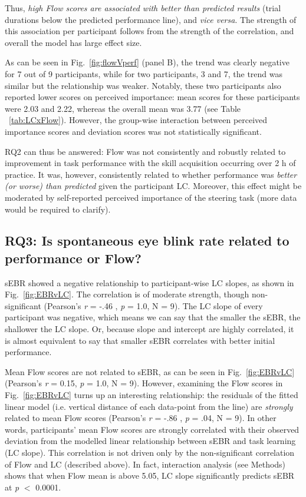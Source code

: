 \documentclass[fleqn,10pt]{wlscirep}
\begin{document}
Thus, {\it high Flow scores are associated with better than predicted results} (trial durations below the predicted performance line), and {\it vice versa}. The strength of this association per participant follows from the strength of the correlation, and overall the model has large effect size.

As can be seen in Fig.~\ref{fig:flowVperf} (panel B), the trend was clearly negative for 7 out of 9 participants, while for two participants, 3 and 7, the trend was similar but the relationship was weaker. Notably, these two participants also reported lower scores on perceived importance: mean scores for these participants were 2.03 and 2.22, whereas the overall mean was 3.77 (see Table ~\ref{tab:LCxFlow}). However, the group-wise interaction between perceived importance scores and deviation scores was not statistically significant.

RQ2 can thus be answered: Flow was not consistently and robustly related to improvement in task performance with the skill acquisition occurring over 2 h of practice. It was, however, consistently related to whether performance was {\it better (or worse) than predicted} given the participant LC. Moreover, this effect might be moderated by self-reported perceived importance of the steering task (more data would be required to clarify).

\subsection*{RQ3: Is spontaneous eye blink rate related to performance or Flow?}

sEBR showed a negative relationship to participant-wise LC slopes, as shown in Fig.~\ref{fig:EBRvLC}. The correlation is of moderate strength, though non-significant (Pearson's {\it r} = -.46 , {\it p} = 1.0, N = 9). %
The LC slope of every participant was negative, which means we can say that the smaller the sEBR, the shallower the LC slope. Or, because slope and intercept are highly correlated, it is almost equivalent to say that smaller sEBR correlates with better initial performance.

Mean Flow scores are not related to sEBR, as can be seen in Fig.~\ref{fig:EBRvLC} (Pearson's {\it r} = 0.15, {\it p} = 1.0, N = 9). %
However, examining the Flow scores in Fig.~\ref{fig:EBRvLC} turns up an interesting relationship: the residuals of the fitted linear model (i.e. vertical distance of each data-point from the line) are {\it strongly} related to mean Flow scores (Pearson's {\it r} = -.86 , {\it p} = .04, N = 9). %
In other words, participants' mean Flow scores are strongly correlated with their observed deviation from the modelled linear relationship between sEBR and task learning (LC slope). This correlation is not driven only by the non-significant correlation of Flow and LC (described above). In fact, interaction analysis (see Methods) shows that when Flow mean is above 5.05, LC slope significantly predicts sEBR at {\it p} $<$ 0.0001.
\end{document}
